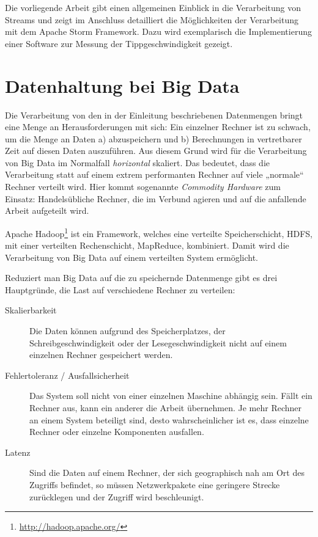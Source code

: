 \documentclass[a4paper,11pt]{scrartcl}
\begin{document}
  Die vorliegende Arbeit gibt einen allgemeinen Einblick in die Verarbeitung
  von Streams und zeigt im Anschluss detailliert die Möglichkeiten der
  Verarbeitung mit dem Apache Storm Framework. Dazu wird exemplarisch die
  Implementierung einer Software zur Messung der Tippgeschwindigkeit gezeigt.


  \section{Datenhaltung bei Big Data}
  Die Verarbeitung von den in der Einleitung beschriebenen Datenmengen bringt
  eine Menge an Herausforderungen mit sich: Ein einzelner Rechner ist zu
  schwach, um die Menge an Daten a) abzuspeichern und b) Berechnungen in
  vertretbarer Zeit auf diesen Daten auszuführen. Aus diesem Grund wird für die
  Verarbeitung von Big Data im Normalfall \textit{horizontal} skaliert. Das
  bedeutet, dass die Verarbeitung statt auf einem extrem performanten Rechner
  auf viele „normale“ Rechner verteilt wird.  Hier kommt sogenannte
  \textit{Commodity Hardware} zum Einsatz: Handelsübliche Rechner, die im
  Verbund agieren und auf die anfallende Arbeit aufgeteilt
  wird.\cite[S.~42]{white2010} 

  Apache Hadoop\footnote{\url{http://hadoop.apache.org/}} ist ein Framework,
  welches eine verteilte Speicherschicht, HDFS, mit einer verteilten
  Rechenschicht, MapReduce, kombiniert. Damit wird die Verarbeitung von Big
  Data auf einem verteilten System ermöglicht.

  Reduziert man Big Data auf die zu speichernde Datenmenge gibt es drei
  Hauptgründe, die Last auf verschiedene Rechner zu
  verteilen:\cite[S.~145]{kleppmann17}

  \begin{description}
    \item[Skalierbarkeit] Die Daten können aufgrund des Speicherplatzes, der
      Schreibgeschwindigkeit oder der Lesegeschwindigkeit nicht auf einem
      einzelnen Rechner gespeichert werden.
    \item[Fehlertoleranz / Ausfallsicherheit] Das System soll nicht von einer
      einzelnen Maschine abhängig sein. Fällt ein Rechner aus, kann ein anderer
      die Arbeit übernehmen. Je mehr Rechner an einem System beteiligt sind,
      desto wahrscheinlicher ist es, dass einzelne Rechner oder einzelne
      Komponenten ausfallen.
    \item[Latenz] Sind die Daten auf einem Rechner, der sich geographisch nah am
      Ort des Zugriffs befindet, so müssen Netzwerkpakete eine geringere Strecke
      zurücklegen und der Zugriff wird beschleunigt.
  \end{description}
\end{document}
